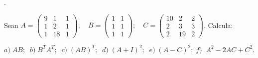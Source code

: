 \begin{ejre}.

\noindent Sean $A= \left( \begin{matrix}  9&1&1\\1&2&1\\1&18&1 \end{matrix} \right); \quad B=\left( \begin{matrix}  1&1\\1&1\\1&1 \end{matrix} \right); \quad C=\left( \begin{matrix} 10&2&2\\2&3&3\\2&19&2  \end{matrix} \right)$. Calcula:
	
\small{ \noindent  $a)\; AB;\; \; b)\; B^TA^T;\; \;  c)\; (AB)^T;\; \; d)\; (A+I)^2; \; \;  e)\; (A-C)^2;\; f)\; \; A^2-2AC+C^2$}\normalsize{.}
\end{ejre}
